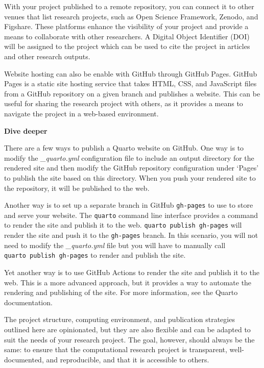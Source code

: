 \documentclass[
  letterpaper,
  krantz1]{latex/krantz-mod}
\theoremstyle{definition}
\theoremstyle{definition}
\theoremstyle{remark}
\begin{document}
With your project published to a remote repository, you can connect it
to other venues that list research projects, such as Open Science
Framework, Zenodo, and Figshare. These platforms enhance the visibility
of your project and provide a means to collaborate with other
researchers. A Digital Object Identifier (DOI) will be assigned to the
project which can be used to cite the project in articles and other
research outputs.

Website hosting can also be enable with GitHub through GitHub Pages.
GitHub Pages is a static site hosting service that takes HTML, CSS, and
JavaScript files from a GitHub repository on a given branch and
publishes a website. This can be useful for sharing the research project
with others, as it provides a means to navigate the project in a
web-based environment.

\begin{tcolorbox}[enhanced jigsaw, toprule=.15mm, breakable, colback=white, arc=.35mm, left=2mm, colframe=quarto-callout-color-frame, opacityback=0, bottomrule=.15mm, rightrule=.15mm, leftrule=.75mm]

\textbf{ Dive deeper}

There are a few ways to publish a Quarto website on GitHub. One way is
to modify the \emph{\_quarto.yml} configuration file to include an
output directory for the rendered site and then modify the GitHub
repository configuration under `Pages' to publish the site based on this
directory. When you push your rendered site to the repository, it will
be published to the web.

Another way is to set up a separate branch in GitHub \texttt{gh-pages}
to use to store and serve your website. The \texttt{quarto} command line
interface provides a command to render the site and publish it to the
web. \texttt{quarto\ publish\ gh-pages} will render the site and push it
to the \texttt{gh-pages} branch. In this scenario, you will not need to
modify the \emph{\_quarto.yml} file but you will have to manually call
\texttt{quarto\ publish\ gh-pages} to render and publish the site.

Yet another way is to use GitHub Actions to render the site and publish
it to the web. This is a more advanced approach, but it provides a way
to automate the rendering and publishing of the site. For more
information, see the Quarto documentation.

\end{tcolorbox}

The project structure, computing environment, and publication strategies
outlined here are opinionated, but they are also flexible and can be
adapted to suit the needs of your research project. The goal, however,
should always be the same: to ensure that the computational research
project is transparent, well-documented, and reproducible, and that it
is accessible to others.
\end{document}
